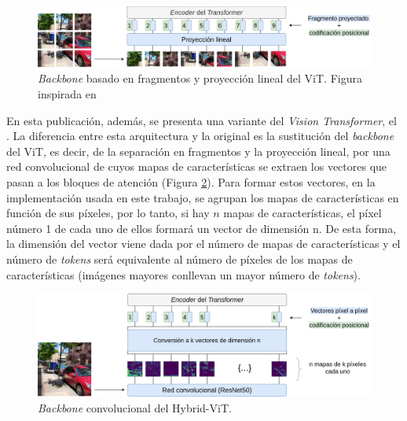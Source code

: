 \begin{figure}[H]
\centering
\includegraphics[width=1\linewidth]{imagenes/vit.png} 
\captionsetup{width=.8\linewidth}
\caption{\textit{Backbone} basado en fragmentos y proyección lineal del ViT. Figura inspirada en \cite{image16x16words}}
\label{fig:vit}
\end{figure}

En esta publicación, además, se presenta una variante del \textit{Vision Transformer}, el . La diferencia entre esta arquitectura y la original es la sustitución del \textit{backbone} del ViT, es decir, de la separación en fragmentos y la proyección lineal, por una red convolucional de cuyos mapas de características se extraen los vectores que pasan a los bloques de atención (Figura \ref{fig:hybrid-vit}). Para formar estos vectores, en la implementación usada en este trabajo, se agrupan los mapas de características en función de sus píxeles, por lo tanto, si hay $n$ mapas de características, el píxel número 1 de cada uno de ellos formará un vector de dimensión n. De esta forma, la dimensión del vector viene dada por el número de mapas de características y el número de \textit{tokens} será equivalente al número de píxeles de los mapas de características (imágenes mayores conllevan un mayor número de \textit{tokens}).

\begin{figure}[H]
\centering
\includegraphics[width=1\linewidth]{imagenes/vit-hybrid.png} 
\captionsetup{width=.8\linewidth}
\caption{\textit{Backbone} convolucional del Hybrid-ViT.}
\label{fig:hybrid-vit}
\end{figure}

